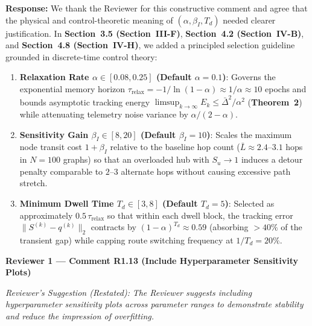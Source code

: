 \documentclass[11pt,a4paper]{article}
\newcommand{\cbox}[2]{%
  \vspace{0.6em}\noindent\textbf{#1}\par\smallskip
  \noindent\textit{Reviewer's Suggestion (Restated):} \textit{#2}\par\smallskip
}
\begin{document}
\noindent\textbf{Response:} We thank the Reviewer for this constructive comment and agree that the physical and control-theoretic meaning of $(\alpha, \beta_I, T_d)$ needed clearer justification. In \textbf{Section~3.5 (Section~III-F)}, \textbf{Section~4.2 (Section~IV-B)}, and \textbf{Section~4.8 (Section~IV-H)}, we added a principled selection guideline grounded in discrete-time control theory:
\begin{enumerate}[leftmargin=1.8em]
    \item \textbf{Relaxation Rate $\alpha \in [0.08, 0.25]$ (Default $\alpha=0.1$)}: Governs the exponential memory horizon $\tau_{\text{relax}} = -1/\ln(1-\alpha) \approx 1/\alpha \approx 10$ epochs and bounds asymptotic tracking energy $\limsup_{k\to\infty} E_k \le \bar{\Delta}^2/\alpha^2$ (\textbf{Theorem~2}) while attenuating telemetry noise variance by $\alpha/(2-\alpha)$.
    \item \textbf{Sensitivity Gain $\beta_I \in [8, 20]$ (Default $\beta_I=10$)}: Scales the maximum node transit cost $1+\beta_I$ relative to the baseline hop count ($\bar{L} \approx 2.4$--$3.1$ hops in $N=100$ graphs) so that an overloaded hub with $S_u \to 1$ induces a detour penalty comparable to $2$--$3$ alternate hops without causing excessive path stretch.
    \item \textbf{Minimum Dwell Time $T_d \in [3, 8]$ (Default $T_d=5$)}: Selected as approximately $0.5\,\tau_{\text{relax}}$ so that within each dwell block, the tracking error $\|S^{(k)}-q^{(k)}\|_2$ contracts by $(1-\alpha)^{T_d} \approx 0.59$ (absorbing $>40\%$ of the transient gap) while capping route switching frequency at $1/T_d = 20\%$.
\end{enumerate}

\hrulefill

\cbox{Reviewer 1 --- Comment R1.13 (Include Hyperparameter Sensitivity Plots)}{The Reviewer suggests including hyperparameter sensitivity plots across parameter ranges to demonstrate stability and reduce the impression of overfitting.}
\end{document}
